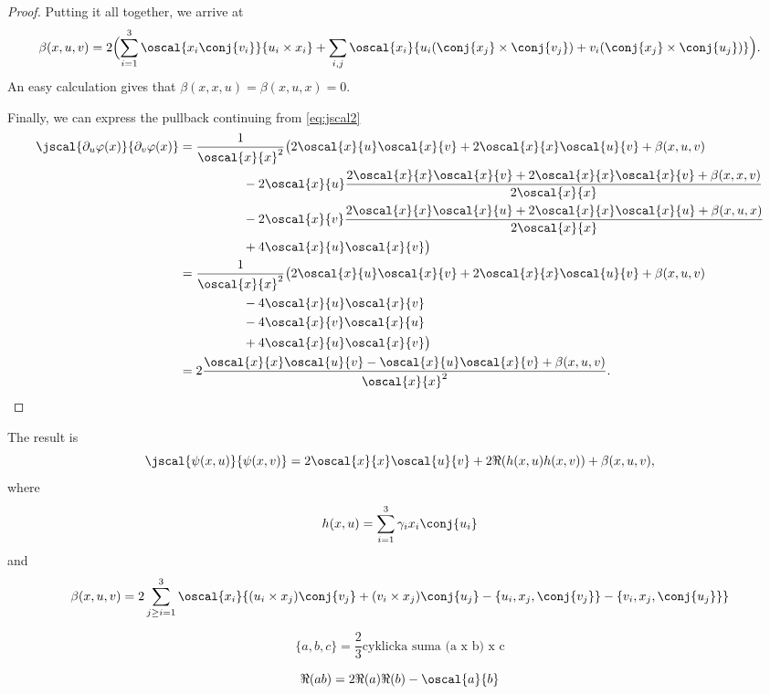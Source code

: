 \begin{proof}
Putting it all together, we arrive at
\[
\beta(x,u,v) = 2\Bigl( \sum_{i=1}^3 \oscal{x_i\conj{v_i}}{u_i\times x_i} + \sum_{i,j} \oscal{x_i}{u_i(\conj{x_j}\times \conj{v_j}) + v_i(\conj{x_j}\times \conj{u_j})} \Bigr).
\]
An easy calculation gives that $\beta(x,x,u) = \beta(x,u,x) = 0$. %

Finally, we can express the pullback continuing from \eqref{eq:jscal2}
\begin{align*}
\jscal{\partial_u \varphi(x)}{\partial_v \varphi(x)} 
        & = \frac{1}{\oscal{x}{x}^2}\bigl( 2\oscal{x}{u}\oscal{x}{v} + 2\oscal{x}{x}\oscal{u}{v} + \beta(x,u,v) \\
		& \qquad \qquad \quad - 2\oscal{x}{u}\frac{2\oscal{x}{x}\oscal{x}{v} + 2\oscal{x}{x}\oscal{x}{v} + \beta(x,x,v)}{2\oscal{x}{x}} \\
		& \qquad \qquad \quad - 2\oscal{x}{v}\frac{2\oscal{x}{x}\oscal{x}{u} + 2\oscal{x}{x}\oscal{x}{u} + \beta(x,u,x)}{2\oscal{x}{x}} \\
		& \qquad \qquad \quad + 4\oscal{x}{u}\oscal{x}{v} \bigr) \\
        & = \frac{1}{\oscal{x}{x}^2}\bigl( 2\oscal{x}{u}\oscal{x}{v} + 2\oscal{x}{x}\oscal{u}{v} + \beta(x,u,v) \\
		& \qquad \qquad \quad  - 4\oscal{x}{u}\oscal{x}{v} \\        
		& \qquad \qquad \quad - 4\oscal{x}{v}\oscal{x}{u}  \\
		& \qquad \qquad \quad +  4\oscal{x}{u}\oscal{x}{v} \bigr) \\
        & = 2\frac{ \oscal{x}{x}\oscal{u}{v} - \oscal{x}{u}\oscal{x}{v} + \beta(x,u,v) }{\oscal{x}{x}^2}.
\end{align*}
\end{proof}

The result is
\begin{equation}
\jscal{\psi(x,u)}{\psi(x,v)} = 2\oscal{x}{x}\oscal{u}{v} + 2\Re(h(x,u)h(x,v)) + \beta(x,u,v),
\end{equation}
where
	\[h(x,u) = \sum_{i=1}^3 \gamma_i x_i \conj{u_i}\] 
and
\begin{equation}
\beta(x,u,v) = 2\sum_{j \geq i = 1}^3 \oscal{x_i}{(u_i \times x_j)\conj{v_j} + (v_i \times x_j)\conj{u_j}  - \{u_i, x_j, \conj{v_j}\} - \{v_i, x_j, \conj{u_j} \}}
\end{equation}

\[
\{a,b,c\} = \frac{2}{3}\text{cyklicka suma (a x b) x c}
\]

\[
\Re (ab) = 2\Re(a)\Re(b) - \oscal{a}{b}
\]
